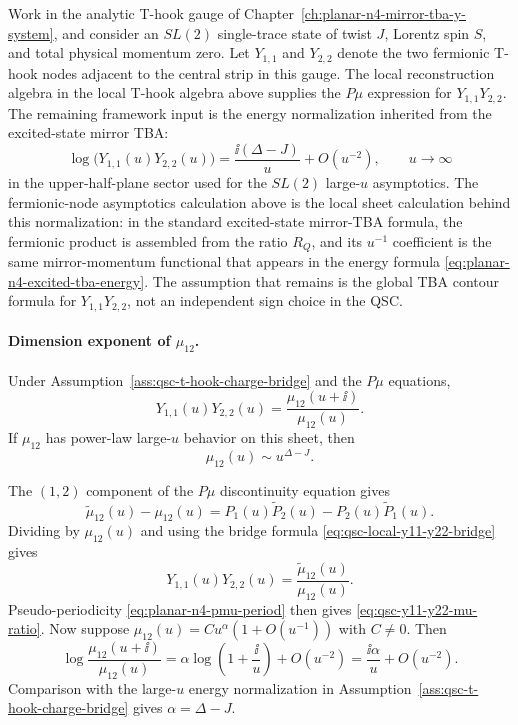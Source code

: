 \begin{assumption}
\label{ass:qsc-t-hook-charge-bridge}
Work in the analytic T-hook gauge of
Chapter~\ref{ch:planar-n4-mirror-tba-y-system}, and consider an \(SL(2)\)
single-trace state of twist \(J\), Lorentz spin \(S\), and total physical
momentum zero.  Let \(Y_{1,1}\) and \(Y_{2,2}\) denote the two fermionic
T-hook nodes adjacent to the central strip in this gauge.  The local
reconstruction algebra in
the local T-hook algebra above supplies the \(P\mu\)
expression for \(Y_{1,1}Y_{2,2}\).  The remaining framework input is the
energy normalization inherited from the excited-state mirror TBA:
\[
  \log\bigl(Y_{1,1}(u)Y_{2,2}(u)\bigr)
  =
  \frac{\ii(\Delta-J)}{u}+O(u^{-2}),
  \qquad u\to\infty
\]
in the upper-half-plane sector used for the \(SL(2)\) large-\(u\)
asymptotics.  The fermionic-node asymptotics calculation above is the
local sheet calculation behind this normalization: in the standard
excited-state mirror-TBA formula, the fermionic product is assembled from the
ratio \(R_Q\), and its \(u^{-1}\) coefficient is the same mirror-momentum
functional that appears in the energy formula
\eqref{eq:planar-n4-excited-tba-energy}.  The assumption that remains is the
global TBA contour formula for \(Y_{1,1}Y_{2,2}\), not an independent sign
choice in the QSC.
\end{assumption}

\paragraph{Dimension exponent of \(\mu_{12}\).}
Under Assumption~\ref{ass:qsc-t-hook-charge-bridge} and the \(P\mu\)
equations,
\begin{equation}
  Y_{1,1}(u)Y_{2,2}(u)
  =
  \frac{\mu_{12}(u+\ii)}{\mu_{12}(u)}.
  \label{eq:qsc-y11-y22-mu-ratio}
\end{equation}
If \(\mu_{12}\) has power-law large-\(u\) behavior on this sheet, then
\[
  \mu_{12}(u)\sim u^{\Delta-J}.
\]

The \((1,2)\) component of the \(P\mu\) discontinuity equation gives
\[
  \widetilde\mu_{12}(u)-\mu_{12}(u)
  =
  P_1(u)\widetilde P_2(u)-P_2(u)\widetilde P_1(u).
\]
Dividing by \(\mu_{12}(u)\) and using the bridge formula
\eqref{eq:qsc-local-y11-y22-bridge} gives
\[
  Y_{1,1}(u)Y_{2,2}(u)
  =
  \frac{\widetilde\mu_{12}(u)}{\mu_{12}(u)}.
\]
Pseudo-periodicity \eqref{eq:planar-n4-pmu-period} then gives
\eqref{eq:qsc-y11-y22-mu-ratio}.  Now suppose
\(\mu_{12}(u)=C u^\alpha(1+O(u^{-1}))\) with \(C\neq0\).  Then
\[
  \log\frac{\mu_{12}(u+\ii)}{\mu_{12}(u)}
  =
  \alpha\log\left(1+\frac{\ii}{u}\right)+O(u^{-2})
  =
  \frac{\ii\alpha}{u}+O(u^{-2}).
\]
Comparison with the large-\(u\) energy normalization in
Assumption~\ref{ass:qsc-t-hook-charge-bridge} gives
\(\alpha=\Delta-J\).

